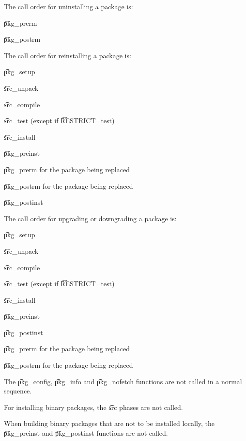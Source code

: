 The call order for uninstalling a package is:

\begin{compactitem}
\item \t{pkg\_prerm}
\item \t{pkg\_postrm}
\end{compactitem}

The call order for reinstalling a package is:

\begin{compactitem}
\item \t{pkg\_setup}
\item \t{src\_unpack}
\item \t{src\_compile}
\item \t{src\_test} (except if \t{RESTRICT=test})
\item \t{src\_install}
\item \t{pkg\_preinst}
\item \t{pkg\_prerm} for the package being replaced
\item \t{pkg\_postrm} for the package being replaced
\item \t{pkg\_postinst}
\end{compactitem}

The call order for upgrading or downgrading a package is:

\begin{compactitem}
\item \t{pkg\_setup}
\item \t{src\_unpack}
\item \t{src\_compile}
\item \t{src\_test} (except if \t{RESTRICT=test})
\item \t{src\_install}
\item \t{pkg\_preinst}
\item \t{pkg\_postinst}
\item \t{pkg\_prerm} for the package being replaced
\item \t{pkg\_postrm} for the package being replaced
\end{compactitem}

The \t{pkg\_config}, \t{pkg\_info} and \t{pkg\_nofetch} functions are not called in a normal
sequence.

For installing binary packages, the \t{src} phases are not called.

When building binary packages that are not to be installed locally, the \t{pkg\_preinst}
and \t{pkg\_postinst} functions are not called.


